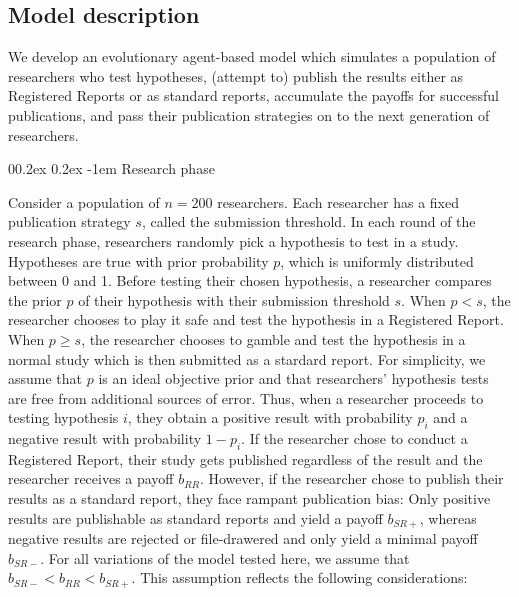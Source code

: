 \documentclass[british,,man,floatsintext]{apa6}
\makeatletter
\renewcommand{\paragraph}{\@startsection{paragraph}{4}{\parindent}%
  {0\baselineskip \@plus 0.2ex \@minus 0.2ex}%
  {-1em}%
  {\normalfont\normalsize\bfseries\itshape\typesectitle}}
\makeatother
\begin{document}
\hypertarget{model-description}{%
\subsection{Model description}\label{model-description}}

We develop an evolutionary agent-based model which simulates a population of researchers who test hypotheses, (attempt to) publish the results either as Registered Reports or as standard reports, accumulate the payoffs for successful publications, and pass their publication strategies on to the next generation of researchers.

\hypertarget{research-phase}{%
\paragraph{Research phase}\label{research-phase}}

Consider a population of \(n = 200\) researchers.
Each researcher has a fixed publication strategy \(s\), called the submission threshold.
In each round of the research phase, researchers randomly pick a hypothesis to test in a study.
Hypotheses are true with prior probability \(p\), which is uniformly distributed between 0 and 1.
Before testing their chosen hypothesis, a researcher compares the prior \(p\) of their hypothesis with their submission threshold \(s\).
When \(p < s\), the researcher chooses to play it safe and test the hypothesis in a Registered Report.
When \(p \geq s\), the researcher chooses to gamble and test the hypothesis in a normal study which is then submitted as a stardard report.
For simplicity, we assume that \(p\) is an ideal objective prior and that researchers' hypothesis tests are free from additional sources of error.
Thus, when a researcher proceeds to testing hypothesis \(i\), they obtain a positive result with probability \(p_i\) and a negative result with probability \(1-p_i\).
If the researcher chose to conduct a Registered Report, their study gets published regardless of the result and the researcher receives a payoff \(b_{RR}\).
However, if the researcher chose to publish their results as a standard report, they face rampant publication bias:
Only positive results are publishable as standard reports and yield a payoff \(b_{SR+}\), whereas negative results are rejected or file-drawered and only yield a minimal payoff \(b_{SR-}\).
For all variations of the model tested here, we assume that \(b_{SR-} < b_{RR} < b_{SR+}\).
This assumption reflects the following considerations:
\end{document}
